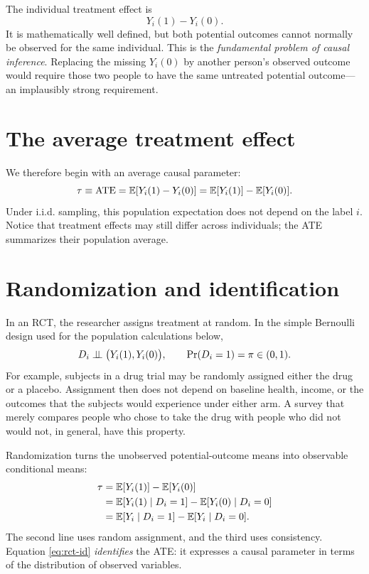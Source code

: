 The individual treatment effect is
\[
  Y_i(1)-Y_i(0).
\]
It is mathematically well defined, but both potential outcomes cannot normally be
observed for the same individual.  This is the \emph{fundamental problem of causal
inference}.  Replacing the missing $Y_i(0)$ by another person's observed outcome
would require those two people to have the same untreated potential outcome---an
implausibly strong requirement.

\section{The average treatment effect}
\label{sec:rct-ate}

We therefore begin with an average causal parameter:
\begin{equation}
  \tau\equiv \operatorname{ATE}
  =\mathbb{E}\!\left[Y_i(1)-Y_i(0)\right]
  =\mathbb{E}[Y_i(1)]-\mathbb{E}[Y_i(0)].
  \label{eq:rct-ate}
\end{equation}
Under i.i.d. sampling, this population expectation does not depend on the label
$i$.  Notice that treatment effects may still differ across individuals; the ATE
summarizes their population average.

\section{Randomization and identification}
\label{sec:rct-identification}

In an RCT, the researcher assigns treatment at random.  In the simple Bernoulli
design used for the population calculations below,
\begin{equation}
  D_i\mathrel{\perp\!\!\!\perp} \bigl(Y_i(1),Y_i(0)\bigr),
  \qquad \Pr(D_i=1)=\pi\in(0,1).
  \label{eq:rct-randomization}
\end{equation}
For example, subjects in a drug trial may be randomly assigned either the drug or
a placebo.  Assignment then does not depend on baseline health, income, or the
outcomes that the subjects would experience under either arm.  A survey that merely
compares people who chose to take the drug with people who did not would not, in
general, have this property.

Randomization turns the unobserved potential-outcome means into observable
conditional means:
\begin{align}
  \tau
  &=\mathbb{E}[Y_i(1)]-\mathbb{E}[Y_i(0)] \notag\\
  &=\mathbb{E}[Y_i(1)\mid D_i=1]-\mathbb{E}[Y_i(0)\mid D_i=0] \notag\\
  &=\mathbb{E}[Y_i\mid D_i=1]-\mathbb{E}[Y_i\mid D_i=0].
  \label{eq:rct-id}
\end{align}
The second line uses random assignment, and the third uses consistency.  Equation
\eqref{eq:rct-id} \emph{identifies} the ATE: it expresses a causal parameter in
terms of the distribution of observed variables.


